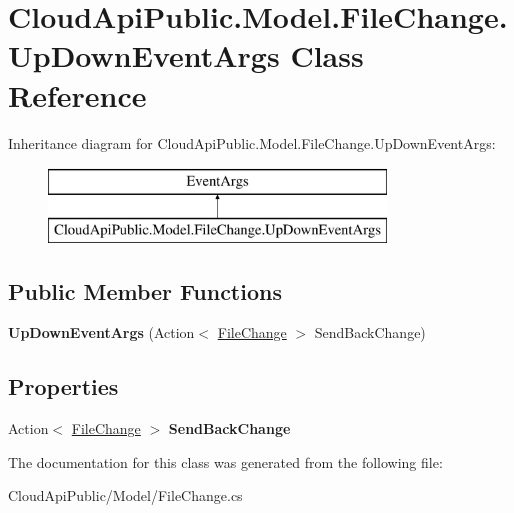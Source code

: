 \hypertarget{class_cloud_api_public_1_1_model_1_1_file_change_1_1_up_down_event_args}{\section{Cloud\-Api\-Public.\-Model.\-File\-Change.\-Up\-Down\-Event\-Args Class Reference}
\label{class_cloud_api_public_1_1_model_1_1_file_change_1_1_up_down_event_args}
}
Inheritance diagram for Cloud\-Api\-Public.\-Model.\-File\-Change.\-Up\-Down\-Event\-Args\-:\begin{figure}[H]
\begin{center}
\leavevmode
\includegraphics[height=2.000000cm]{class_cloud_api_public_1_1_model_1_1_file_change_1_1_up_down_event_args}
\end{center}
\end{figure}
\subsection*{Public Member Functions}
\begin{DoxyCompactItemize}
\item 
\hypertarget{class_cloud_api_public_1_1_model_1_1_file_change_1_1_up_down_event_args_a628d6113901ee93135f4d646495bc001}{{\bfseries Up\-Down\-Event\-Args} (Action$<$ \hyperlink{class_cloud_api_public_1_1_model_1_1_file_change}{File\-Change} $>$ Send\-Back\-Change)}\label{class_cloud_api_public_1_1_model_1_1_file_change_1_1_up_down_event_args_a628d6113901ee93135f4d646495bc001}

\end{DoxyCompactItemize}
\subsection*{Properties}
\begin{DoxyCompactItemize}
\item 
\hypertarget{class_cloud_api_public_1_1_model_1_1_file_change_1_1_up_down_event_args_a02ff4b681eb662c0601afa09e50060d0}{Action$<$ \hyperlink{class_cloud_api_public_1_1_model_1_1_file_change}{File\-Change} $>$ {\bfseries Send\-Back\-Change}}\label{class_cloud_api_public_1_1_model_1_1_file_change_1_1_up_down_event_args_a02ff4b681eb662c0601afa09e50060d0}

\end{DoxyCompactItemize}


The documentation for this class was generated from the following file\-:\begin{DoxyCompactItemize}
\item 
Cloud\-Api\-Public/\-Model/File\-Change.\-cs\end{DoxyCompactItemize}
